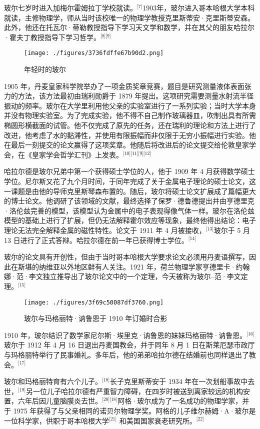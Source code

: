玻尔七岁时进入加梅尔霍姆拉丁学校就读。\(^\text{[7]}\)1903年，玻尔进入哥本哈根大学本科就读，主修物理学，师从当时该校唯一的物理学教授克里斯蒂安·克里斯蒂安森。此外，他还在托瓦尔·蒂勒教授指导下学习天文学和数学，并在其父的朋友哈拉尔·霍夫丁教授指导下学习哲学。\(^\text{[8][9]}\)
\begin{figure}[ht]
\centering
\texttt{[image: ./figures/3736fdffe67b90d2.png]}
\caption{年轻时的玻尔} \label{fig_NRSbr_1}
\end{figure}
1905 年，丹麦皇家科学院举办了一项金质奖章竞赛，题目是研究测量液体表面张力的方法，该方法最初由瑞利勋爵于 1879 年提出。这项研究需要测量水射流半径振动的频率。玻尔在大学里利用他父亲的实验室进行了一系列实验；当时大学本身并没有物理实验室。为了完成实验，他不得不自己制作玻璃器皿，吹制出具有所需椭圆形横截面的试管。他不仅完成了原先的任务，还在瑞利的理论和方法上进行了改进，他考虑了水的黏滞性，并使用有限振幅而非仅限于无穷小振幅进行实验。他在最后一刻提交的论文赢得了这项奖章。他随后将改进后的论文提交给伦敦皇家学会，在《皇家学会哲学汇刊》上发表。\(^\text{[10][11][9][12]}\)

哈拉尔德是玻尔兄弟中第一个获得硕士学位的人，他于 1909 年 4 月获得数学硕士学位。尼尔斯又花了九个月时间，于同年完成了关于金属电子理论的硕士论文，这一课题是由他的导师克里斯琴森布置的。随后，玻尔将硕士论文扩展成了篇幅更大的博士论文。他调研了该领域的文献，最终选择了保罗·德鲁德提出并由亨德里克·洛伦兹完善的模型，该模型认为金属中的电子表现得像气体一样。玻尔在洛伦兹模型的基础上进行了扩展，但仍无法解释霍尔效应等现象，最终他得出结论：电子理论无法完全解释金属的磁性特性。论文于 1911 年 4 月被接收，\(^\text{[13]}\)玻尔于 5 月 13 日进行了正式答辩。哈拉尔德在前一年已获得博士学位。\(^\text{[14]}\)

玻尔的论文具有开创性，但由于当时哥本哈根大学要求论文必须用丹麦语撰写，因此在斯堪的纳维亚以外地区鲜有人关注。1921 年，荷兰物理学家亨德里卡·约翰娜·范·李文独立推导出了玻尔论文中的一个定理，今天被称为玻尔–范·李文定理。\(^\text{[15]}\)
\begin{figure}[ht]
\centering
\texttt{[image: ./figures/3f69c50087df3760.png]}
\caption{玻尔与玛格丽特·讷鲁恩于 1910 年订婚时合影} \label{fig_NRSbr_2}
\end{figure}
1910 年，玻尔结识了数学家尼尔斯·埃里克·讷鲁恩的妹妹玛格丽特·讷鲁恩。\(^\text{[16]}\)玻尔于 1912 年 4 月 16 日退出丹麦国教会，并于同年 8 月 1 日在斯莱厄瑟市政厅与玛格丽特举行了民事婚礼。多年后，他的弟弟哈拉尔德在结婚前也同样退出了教会。\(^\text{[17]}\)

玻尔和玛格丽特育有六个儿子。\(^\text{[18]}\)长子克里斯蒂安于 1934 年在一次划船事故中去世，\(^\text{[19]}\)另一位儿子哈拉尔德有严重智力障碍，在四岁时被送到离家较远的机构安置，六年后因儿童脑膜炎去世。\(^\text{[20][18]}\)阿格·玻尔成为了一名成功的物理学家，并于 1975 年获得了与父亲相同的诺贝尔物理学奖。阿格的儿子维尔赫姆·A·玻尔是一位科学家，供职于哥本哈根大学\(^\text{[21]}\) 和美国国家衰老研究所。\(^\text{[22]}\)


